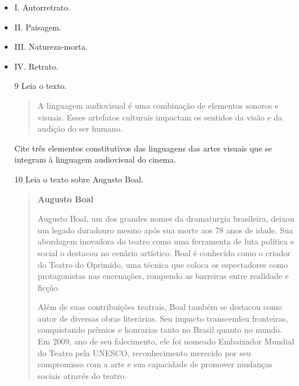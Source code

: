 \begin{itemize}
  \item I. Autorretrato.
  \item II. Paisagem.
  \item III. Natureza-morta.
  \item IV. Retrato.
\begin{itemize}


\num{9} Leia o texto.

\begin{quote}
A linguagem audiovisual é uma combinação de elementos sonoros e visuais. Esses artefatos culturais impactam os sentidos da visão e da audição do ser humano.

\end{quote}

Cite três elementos constitutivos das linguagens das artes visuais que
se integram à linguagem audiovisual do cinema.



\num{10} Leia o texto sobre Augusto Boal.

\begin{quote}
\textbf{Augusto Boal}

Augusto Boal, um dos grandes nomes da dramaturgia brasileira, deixou um legado duradouro mesmo após sua morte aos 78 anos de idade. Sua abordagem inovadora do teatro como uma ferramenta de luta política e social o destacou no cenário artístico. Boal é conhecido como o criador do Teatro do Oprimido, uma técnica que coloca os espectadores como protagonistas nas encenações, rompendo as barreiras entre realidade e ficção.

Além de suas contribuições teatrais, Boal também se destacou como autor de diversas obras literárias. Seu impacto transcendeu fronteiras, conquistando prêmios e honrarias tanto no Brasil quanto no mundo. Em 2009, ano de seu falecimento, ele foi nomeado Embaixador Mundial do Teatro pela UNESCO, reconhecimento merecido por seu compromisso com a arte e sua capacidade de promover mudanças sociais através do teatro.


\end{quote}
\end{itemize}
\end{itemize}
